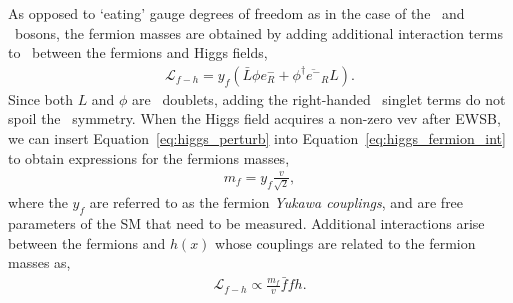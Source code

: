 As opposed to `eating' gauge degrees of freedom as in the case of the \fieldWpm~and \fieldZ~bosons,
the fermion masses are obtained by adding additional interaction terms to \SML~between the
fermions and Higgs fields,
\begin{align}
	\mathcal{L}_{f-h} = y_f \left( \bar{L} \phi e^-_R + \phi^{\dagger} \overline{e^-}_R L\right).
	\label{eq:higgs_fermion_int}
\end{align}
Since both $L$ and $\phi$ are \SUtwo~doublets, adding the right-handed \SUtwo~singlet terms
do not spoil the \SUtwo~symmetry.
When the Higgs field acquires a non-zero vev after EWSB, we can insert Equation~\ref{eq:higgs_perturb} into Equation~\ref{eq:higgs_fermion_int} to obtain expressions for the fermions masses,
\begin{align}
	m_f = y_f \frac{v}{\sqrt{2}},
	\label{eq:fermion_mass_term}
\end{align}
where the $y_f$ are referred to as the fermion \textit{Yukawa couplings}, and are free parameters
of the SM that need to be measured.
Additional interactions arise between the fermions and $h(x)$ whose couplings are related
to the fermion masses as,
\begin{align}
	\mathcal{L}_{f-h} \propto \frac{m_f}{v} \bar{f}f h.
	\label{eq:higgs_fermion_coupling}
\end{align}

